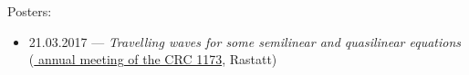 \noindent Posters:
\begin{itemize}
  \item 21.03.2017 --- \textsl{Travelling waves for some semilinear and quasilinear equations}  (\href{\urlSecondAnnualCrc}{ annual meeting of the CRC 1173}, Rastatt)
\end{itemize}
